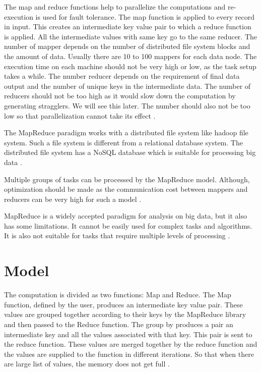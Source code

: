 \documentclass[sigconf]{acmart}
\begin{document}
The map and reduce functions help to parallelize the computations and re-execution is used for fault tolerance. The map function is applied to every record in input. This creates an intermediate key value pair to which a reduce function is applied. All the intermediate values with same key go to the same reducer. The number of mapper depends on the number of distributed file system blocks and the amount of data. Usually there are 10 to 100 mappers for each data node. The execution time on each machine should not be very high or low, as the task setup takes a while. The number reducer depends on the requirement of final data output and the number of unique keys in the intermediate data. The number of reducers should not be too high as it would slow down the computation by generating stragglers. We will see this later. The number should also not be too low so that parallelization cannot take its effect \cite{rf2}. 

The MapReduce paradigm works with a distributed file system like hadoop file system. Such a file system is different from a relational database system. The distributed file system has a NoSQL database which is suitable for processing big data \cite{rf5}.

Multiple groups of tasks can be processed by the MapReduce model. Although, optimization should be made as the communication cost between mappers and reducers can be very high for such a model \cite{rf6}.

MapReduce is a widely accepted paradigm for analysis on big data, but it also has some limitations. It cannot be easily used for complex tasks and algorithms. It is also not suitable for tasks that require multiple levels of processing \cite{rf7}.

\section{Model}
The computation is divided as two functions: Map and Reduce. The Map function, defined by the user, produces an intermediate key value pair. These values are grouped together according to their keys by the MapReduce library and then passed to the Reduce function. The group by produces a pair an intermediate key and all the values associated with that key. This pair is sent to the reduce function. These values are merged together by the reduce function and the values are supplied to the function in different iterations. So that when there are large list of values, the memory does not get full \cite{rf2}. 
\end{document}
